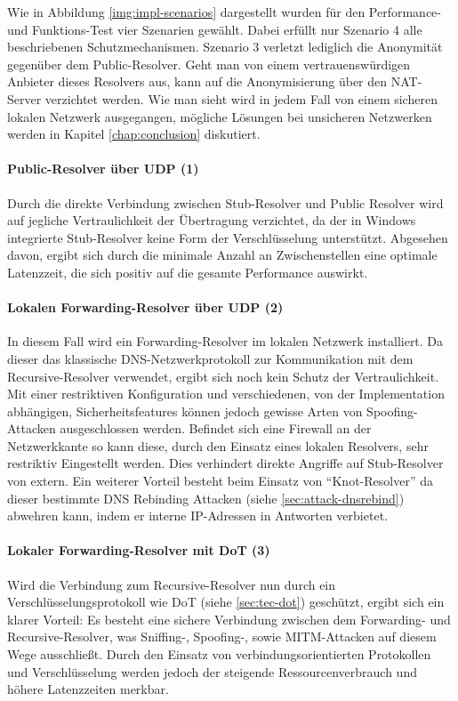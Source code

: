 Wie in Abbildung \ref{img:impl-scenarios} dargestellt wurden für den Performance- und Funktions-Test vier Szenarien gewählt. Dabei erfüllt nur Szenario 4 alle beschriebenen Schutzmechanismen. Szenario 3 verletzt lediglich die Anonymität gegenüber dem Public-Resolver. Geht man von einem vertrauenswürdigen Anbieter dieses Resolvers aus, kann auf die Anonymisierung über den NAT-Server verzichtet werden. Wie man sieht wird in jedem Fall von einem sicheren lokalen Netzwerk ausgegangen, mögliche Lösungen bei unsicheren Netzwerken werden in Kapitel \ref{chap:conclusion} diskutiert. 

\paragraph{Public-Resolver über UDP (1)}
Durch die direkte Verbindung zwischen Stub-Resolver und Public Resolver wird auf jegliche Vertraulichkeit der Übertragung verzichtet, da der in Windows integrierte Stub-Resolver keine Form der Verschlüsselung unterstützt. Abgesehen davon, ergibt sich durch die minimale Anzahl an Zwischenstellen eine optimale Latenzzeit, die sich positiv auf die gesamte Performance auswirkt.

\paragraph{Lokalen Forwarding-Resolver über UDP (2)}
In diesem Fall wird ein Forwarding-Resolver im lokalen Netzwerk installiert. Da dieser das klassische DNS-Netzwerkprotokoll zur Kommunikation mit dem Recursive-Resolver verwendet, ergibt sich noch kein Schutz der Vertraulichkeit. Mit einer restriktiven Konfiguration und verschiedenen, von der Implementation abhängigen, Sicherheitsfeatures können jedoch gewisse Arten von Spoofing-Attacken ausgeschlossen werden. Befindet sich eine Firewall an der Netzwerkkante so kann diese, durch den Einsatz eines lokalen Resolvers, sehr restriktiv Eingestellt werden. Dies verhindert direkte Angriffe auf Stub-Resolver von extern. Ein weiterer Vorteil besteht beim Einsatz von ``Knot-Resolver'' da dieser bestimmte DNS Rebinding Attacken (siehe \ref{sec:attack-dnsrebind}) abwehren kann, indem er interne IP-Adressen in Antworten verbietet\cite{KnotResolverDocRebinding}.

\paragraph{Lokaler Forwarding-Resolver mit DoT (3)}
Wird die Verbindung zum Recursive-Resolver nun durch ein Verschlüsselungsprotokoll wie DoT (siehe \ref{sec:tec-dot}) geschützt, ergibt sich ein klarer Vorteil: Es besteht eine sichere Verbindung zwischen dem Forwarding- und Recursive-Resolver, was Sniffing-, Spoofing-, sowie MITM-Attacken auf diesem Wege ausschließt. Durch den Einsatz von verbindungsorientierten Protokollen und Verschlüsselung werden jedoch der steigende Ressourcenverbrauch und höhere Latenzzeiten merkbar.

